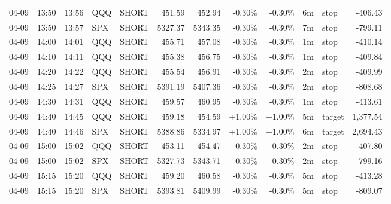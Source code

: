 \documentclass[11pt,a4paper,twoside]{article}
\begin{document}
\begin{center}
\begin{longtable}{>{\color{txtmain}}l l l l l r r r r r >{\color{txtmain}}l r}
04-09 & 13:50 & 13:56 & QQQ & SHORT & 451.59 & 452.94 & \textcolor{lossred}{-0.30\%} & \textcolor{lossred}{-0.30\%} & 6m & stop & \textcolor{lossred}{-406.43} \\
04-09 & 13:50 & 13:57 & SPX & SHORT & 5327.37 & 5343.35 & \textcolor{lossred}{-0.30\%} & \textcolor{lossred}{-0.30\%} & 7m & stop & \textcolor{lossred}{-799.11} \\
04-09 & 14:00 & 14:01 & QQQ & SHORT & 455.71 & 457.08 & \textcolor{lossred}{-0.30\%} & \textcolor{lossred}{-0.30\%} & 1m & stop & \textcolor{lossred}{-410.14} \\
04-09 & 14:10 & 14:11 & QQQ & SHORT & 455.38 & 456.75 & \textcolor{lossred}{-0.30\%} & \textcolor{lossred}{-0.30\%} & 1m & stop & \textcolor{lossred}{-409.84} \\
04-09 & 14:20 & 14:22 & QQQ & SHORT & 455.54 & 456.91 & \textcolor{lossred}{-0.30\%} & \textcolor{lossred}{-0.30\%} & 2m & stop & \textcolor{lossred}{-409.99} \\
04-09 & 14:25 & 14:27 & SPX & SHORT & 5391.19 & 5407.36 & \textcolor{lossred}{-0.30\%} & \textcolor{lossred}{-0.30\%} & 2m & stop & \textcolor{lossred}{-808.68} \\
04-09 & 14:30 & 14:31 & QQQ & SHORT & 459.57 & 460.95 & \textcolor{lossred}{-0.30\%} & \textcolor{lossred}{-0.30\%} & 1m & stop & \textcolor{lossred}{-413.61} \\
04-09 & 14:40 & 14:45 & QQQ & SHORT & 459.18 & 454.59 & \textcolor{wingreen}{+1.00\%} & \textcolor{wingreen}{+1.00\%} & 5m & target & \textcolor{wingreen}{1,377.54} \\
04-09 & 14:40 & 14:46 & SPX & SHORT & 5388.86 & 5334.97 & \textcolor{wingreen}{+1.00\%} & \textcolor{wingreen}{+1.00\%} & 6m & target & \textcolor{wingreen}{2,694.43} \\
04-09 & 15:00 & 15:02 & QQQ & SHORT & 453.11 & 454.47 & \textcolor{lossred}{-0.30\%} & \textcolor{lossred}{-0.30\%} & 2m & stop & \textcolor{lossred}{-407.80} \\
04-09 & 15:00 & 15:02 & SPX & SHORT & 5327.73 & 5343.71 & \textcolor{lossred}{-0.30\%} & \textcolor{lossred}{-0.30\%} & 2m & stop & \textcolor{lossred}{-799.16} \\
04-09 & 15:15 & 15:20 & QQQ & SHORT & 459.20 & 460.58 & \textcolor{lossred}{-0.30\%} & \textcolor{lossred}{-0.30\%} & 5m & stop & \textcolor{lossred}{-413.28} \\
04-09 & 15:15 & 15:20 & SPX & SHORT & 5393.81 & 5409.99 & \textcolor{lossred}{-0.30\%} & \textcolor{lossred}{-0.30\%} & 5m & stop & \textcolor{lossred}{-809.07} \\

\end{longtable}
\end{center}
\end{document}
